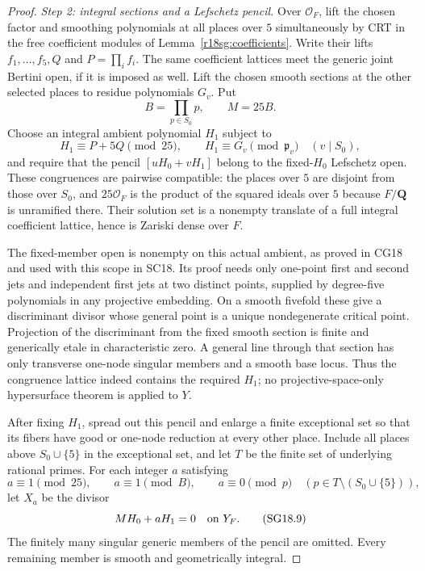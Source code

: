 \begin{proof}
\emph{Step 2: integral sections and a Lefschetz pencil.}
Over \(\mathcal O_F\), lift the chosen factor and
smoothing polynomials at all places over \(5\)
simultaneously by CRT in the free coefficient
modules of Lemma~\ref{r18sg:coefficients}.
Write their lifts \(f_1,\ldots,f_5,Q\) and
\(P=\prod_i f_i\).
The same coefficient lattices meet the generic
joint Bertini open, if it is imposed as well.
Lift the chosen smooth sections at the other
selected places to residue polynomials \(G_v\).
Put
\[
 B=\prod_{p\in S_0}p,\qquad M=25B.
 \tag{SG18.6}\label{r18sg:M}
\]
Choose an integral ambient polynomial \(H_1\)
subject to
\[
 H_1\equiv P+5Q\pmod{25},\qquad
 H_1\equiv G_v\pmod{\mathfrak p_v}
       \quad(v\mid S_0),
 \tag{SG18.7}\label{r18sg:congruences}
\]
and require that the pencil \([uH_0+vH_1]\)
belong to the fixed-\(H_0\) Lefschetz open.
These congruences are pairwise compatible:
the places over \(5\) are disjoint from those
over \(S_0\), and \(25\mathcal O_F\) is the
product of the squared ideals over \(5\)
because \(F/\mathbf Q\) is unramified there.
Their solution set is a nonempty translate
of a full integral coefficient lattice,
hence is Zariski dense over \(F\).

The fixed-member open is nonempty on this
actual ambient, as proved in CG18 and used
with this scope in SC18.  Its proof needs
only one-point first and second jets and
independent first jets at two distinct
points, supplied by degree-five polynomials
in any projective embedding.  On a smooth
fivefold these give a discriminant divisor
whose general point is a unique nondegenerate
critical point.  Projection of the
discriminant from the fixed smooth section
is finite and generically etale in
characteristic zero.  A general line
through that section has only transverse
one-node singular members and a smooth
base locus.  Thus the congruence lattice
indeed contains the required \(H_1\);
no projective-space-only hypersurface
theorem is applied to \(Y\).

After fixing \(H_1\), spread out this pencil
and enlarge a finite exceptional set so
that its fibers have good or one-node
reduction at every other place.  Include
all places above \(S_0\cup\{5\}\) in the
exceptional set, and let \(T\) be the
finite set of underlying rational primes.
For each integer \(a\) satisfying
\[
 a\equiv1\pmod{25},\qquad a\equiv1\pmod B,
 \qquad
 a\equiv0\pmod p\quad
      (p\in T\setminus(S_0\cup\{5\})),
 \tag{SG18.8}\label{r18sg:a}
\]
let \(X_a\) be the divisor
\[
                         MH_0+aH_1=0
                     \quad\hbox{on }Y_F .
 \tag{SG18.9}\label{r18sg:family}
\]
The finitely many singular generic members
of the pencil are omitted.  Every remaining
member is smooth and geometrically integral.


\end{proof}
